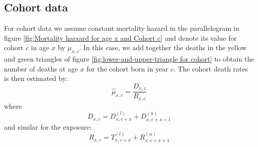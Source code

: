 \subsection{Cohort data}

For cohort data we assume constant mortality hazard in the parallelogram in figure \ref{fig:Mortality harzard for age x and Cohort c} and denote its value for cohort $c$ in age $x$ by ${\mu}_{x,c}$. 
In this case, we add together the deaths in the yellow and green triangles of figure \ref{fig:lower-and-upper-triangle for cohort} to obtain the number of deaths at age $x$ for the cohort born in year $c$.
The cohort death rates is then estimated by:
        \begin{equation}
          \hat{\mu}_{x,c}= \frac{{D}_{x,c}}{{R}_{x,c}}
        \end{equation}
where        
    \begin{equation}
            {D}_{x,c} = {D}_{x,c+x}^{(l)} + {D}_{x,c+x+1}^{(u)}
            \label{eq:death cohort}
    \end{equation} 
and similar for the exposure: 
      \begin{equation}
        {R}_{x,c} = {T}_{x,c+x}^{(l)} + {R}_{x,c+x+1}^{(u)}
        \label{eq:death cohort}
      \end{equation}  

      

